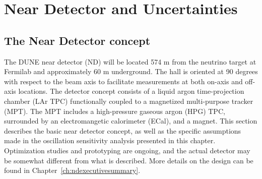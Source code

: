 \section{Near Detector and Uncertainties}\label{sec:nu-osc-06}\label{sec:physics-lbnosc-ND}





\subsection{The Near Detector concept}
\label{sec:ndconcept}

The DUNE near detector (ND) will be located 574 m from the neutrino target at Fermilab and approximately 60 m underground. The hall is oriented at 90 degrees with respect to the beam axis to facilitate measurements at both on-axis and off-axis locations. The detector concept consists of a liquid argon time-projection chamber (LAr TPC) functionally coupled to a magnetized multi-purpose tracker (MPT). The MPT includes a high-pressure gaseous argon (HPG) TPC, surrounded by an electromangetic calorimeter (ECal), and a magnet. This section describes the basic near detector concept, as well as the specific assumptions made in the oscillation sensitivity analysis presented in this chapter. Optimization studies and prototyping are ongoing, and the actual detector may be somewhat different from what is described. More details on the design can be found in Chapter~\ref{ch:ndexecutivesummary}.

